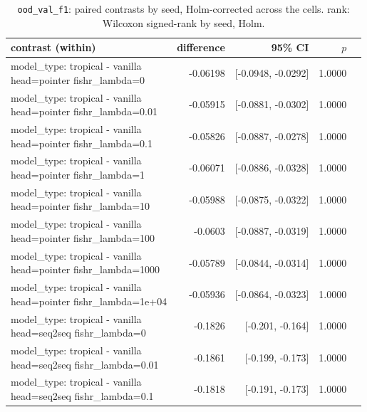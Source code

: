 \documentclass[10pt]{article}
\makeatletter
\newcommand{\stackcell}[1]{\begin{tabular}[t]{@{}l@{}}#1\end{tabular}}
\makeatother
\begin{document}
{\small
\begin{longtable}{lrrrl}
\caption{\texttt{ood\_val\_f1}: paired contrasts by seed, Holm-corrected across the cells. rank: Wilcoxon signed-rank by seed, Holm.}\label{tab:paired-ood_val_f1}\\
\toprule
contrast (within) & difference & 95\% CI & $p$ & \\
\midrule
\endhead
\stackcell{model\_type: tropical - vanilla\\\footnotesize head=pointer fishr\_lambda=0 } & -0.06198 & [-0.0948, -0.0292] & 1.0000 & \\
\stackcell{model\_type: tropical - vanilla\\\footnotesize head=pointer fishr\_lambda=0.01 } & -0.05915 & [-0.0881, -0.0302] & 1.0000 & \\
\stackcell{model\_type: tropical - vanilla\\\footnotesize head=pointer fishr\_lambda=0.1 } & -0.05826 & [-0.0887, -0.0278] & 1.0000 & \\
\stackcell{model\_type: tropical - vanilla\\\footnotesize head=pointer fishr\_lambda=1 } & -0.06071 & [-0.0886, -0.0328] & 1.0000 & \\
\stackcell{model\_type: tropical - vanilla\\\footnotesize head=pointer fishr\_lambda=10 } & -0.05988 & [-0.0875, -0.0322] & 1.0000 & \\
\stackcell{model\_type: tropical - vanilla\\\footnotesize head=pointer fishr\_lambda=100 } & -0.0603 & [-0.0887, -0.0319] & 1.0000 & \\
\stackcell{model\_type: tropical - vanilla\\\footnotesize head=pointer fishr\_lambda=1000 } & -0.05789 & [-0.0844, -0.0314] & 1.0000 & \\
\stackcell{model\_type: tropical - vanilla\\\footnotesize head=pointer fishr\_lambda=1e+04 } & -0.05936 & [-0.0864, -0.0323] & 1.0000 & \\
\stackcell{model\_type: tropical - vanilla\\\footnotesize head=seq2seq fishr\_lambda=0 } & -0.1826 & [-0.201, -0.164] & 1.0000 & \\
\stackcell{model\_type: tropical - vanilla\\\footnotesize head=seq2seq fishr\_lambda=0.01 } & -0.1861 & [-0.199, -0.173] & 1.0000 & \\
\stackcell{model\_type: tropical - vanilla\\\footnotesize head=seq2seq fishr\_lambda=0.1 } & -0.1818 & [-0.191, -0.173] & 1.0000 & \\

\end{longtable}}
\end{document}

